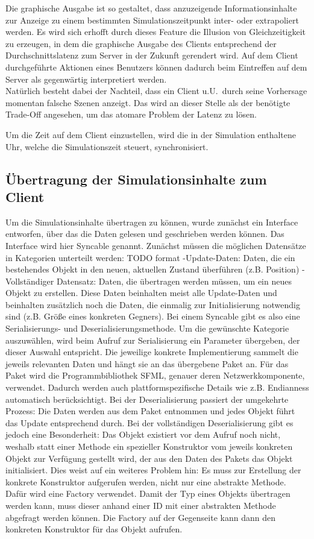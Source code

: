 Die graphische Ausgabe ist so gestaltet, dass anzuzeigende Informationsinhalte zur Anzeige zu einem bestimmten Simulationszeitpunkt inter- oder extrapoliert werden.
Es wird sich erhofft durch dieses Feature die Illusion von Gleichzeitigkeit zu erzeugen, in dem die graphische Ausgabe des Clients entsprechend der Durchschnittslatenz zum Server in der Zukunft gerendert wird. Auf dem Client durchgeführte Aktionen eines Benutzers können dadurch beim Eintreffen auf dem Server als gegenwärtig interpretiert werden.\\
Natürlich besteht dabei der Nachteil, dass ein Client u.U.~durch seine Vorhersage momentan falsche Szenen anzeigt. Das wird an dieser Stelle als der benötigte Trade-Off angesehen, um das atomare Problem der Latenz zu lösen.

Um die Zeit auf dem Client einzustellen, wird die in der Simulation enthaltene Uhr, welche die Simulationszeit steuert, synchronisiert.



\subsection{Übertragung der Simulationsinhalte zum Client}

Um die Simulationsinhalte übertragen zu können, wurde zunächst ein Interface entworfen, über das die Daten gelesen und geschrieben werden können. Das Interface wird hier Syncable genannt.
Zunächst müssen die möglichen Datensätze in Kategorien unterteilt werden: TODO format
-Update-Daten: Daten, die ein bestehendes Objekt in den neuen, aktuellen Zustand überführen (z.B. Position)
-Vollständiger Datensatz: Daten, die übertragen werden müssen, um ein neues Objekt zu erstellen. Diese Daten beinhalten meist alle Update-Daten und beinhalten zusätzlich noch die Daten, die einmalig zur Initialisierung notwendig sind (z.B. Größe eines konkreten Gegners).
Bei einem Syncable gibt es also eine Serialisierungs- und Deserialisierungsmethode. Um die gewünschte Kategorie auszuwählen, wird beim Aufruf zur Serialisierung ein Parameter übergeben, der dieser Auswahl entspricht. Die jeweilige konkrete Implementierung sammelt die jeweils relevanten Daten und hängt sie an das übergebene Paket an. Für das Paket wird die Programmbibliothek SFML, genauer deren Netzwerkkomponente, verwendet. Dadurch werden auch plattformspezifische Details wie z.B. Endianness automatisch berücksichtigt. Bei der Deserialisierung passiert der umgekehrte Prozess: Die Daten werden aus dem Paket entnommen und jedes Objekt führt das Update entsprechend durch. Bei der vollständigen Deserialisierung gibt es jedoch eine Besonderheit: Das Objekt existiert vor dem Aufruf noch nicht, weshalb statt einer Methode ein spezieller Konstruktor vom jeweils konkreten Objekt zur Verfügung gestellt wird, der aus den Daten des Pakets das Objekt initialisiert.
Dies weist auf ein weiteres Problem hin: Es muss zur Erstellung der konkrete Konstruktor aufgerufen werden, nicht nur eine abstrakte Methode. Dafür wird eine Factory verwendet. Damit der Typ eines Objekts übertragen werden kann, muss dieser anhand einer ID mit einer abstrakten Methode abgefragt werden können. Die Factory auf der Gegenseite kann dann den konkreten Konstruktor für das Objekt aufrufen.
